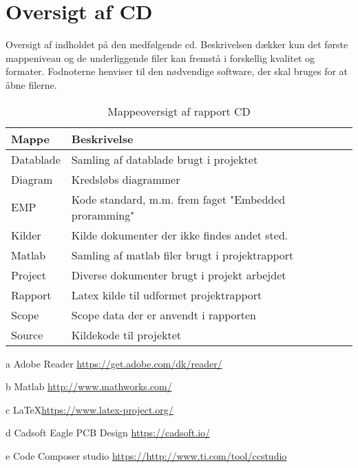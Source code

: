 \chapter{Oversigt af CD}\label{bilag:cd}
Oversigt af indholdet på den medfølgende cd. Beskrivelsen dækker kun det første mappeniveau og de underliggende filer kan fremstå i forskellig kvalitet og formater. Fodnoterne henviser til den nødvendige software, der skal bruges for at åbne filerne.

\begin{table}[h!]
\centering
\caption{Mappeoversigt af rapport CD}
\label{tab:ordliste}
\begin{threeparttable}
\begin{tabular}{l l}
\toprule
\multicolumn{1}{l}{Mappe}       &
\multicolumn{1}{l}{Beskrivelse}  \\ 
\midrule
Datablade					& Samling af datablade brugt i projektet \tnote{a}\\
Diagram						& Kredsløbs diagrammer\tnote{d} \\
EMP							& Kode standard, m.m. frem faget "Embedded proramming"\tnote{a}\\  
Kilder						& Kilde dokumenter der ikke findes andet sted.\tnote{a}\\
Matlab						& Samling af matlab filer brugt i projektrapport\tnote{b} \\
Project						& Diverse dokumenter brugt i projekt arbejdet\tnote{a}\\
Rapport						& Latex kilde til udformet projektrapport\tnote{c} \\
Scope						& Scope data der er anvendt i rapporten\tnote{a}\\
Source                 		& Kildekode til projektet \tnote{e}\\
\bottomrule
\end{tabular}
\begin{tablenotes}
\item[a] Adobe Reader  \url{https://get.adobe.com/dk/reader/}
\item[b] Matlab \url{http://www.mathworks.com/}
\item[c] \LaTeX \url{https://www.latex-project.org/}
\item[d] Cadsoft Eagle PCB Design \url{https://cadsoft.io/}
\item[e] Code Composer studio \url{https://http://www.ti.com/tool/ccstudio}
\end{tablenotes}
\end{threeparttable}
\end{table}
\label{LastPage}
